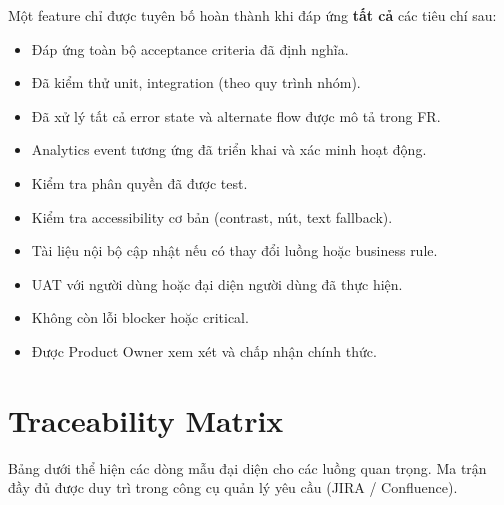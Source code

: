 \documentclass[12pt,a4paper]{article}
\begin{document}
Một feature chỉ được tuyên bố hoàn thành khi đáp ứng \textbf{tất cả} các tiêu chí sau:
\begin{itemize}
  \item[$\square$] Đáp ứng toàn bộ acceptance criteria đã định nghĩa.
  \item[$\square$] Đã kiểm thử unit, integration (theo quy trình nhóm).
  \item[$\square$] Đã xử lý tất cả error state và alternate flow được mô tả trong FR.
  \item[$\square$] Analytics event tương ứng đã triển khai và xác minh hoạt động.
  \item[$\square$] Kiểm tra phân quyền đã được test.
  \item[$\square$] Kiểm tra accessibility cơ bản (contrast, nút, text fallback).
  \item[$\square$] Tài liệu nội bộ cập nhật nếu có thay đổi luồng hoặc business rule.
  \item[$\square$] UAT với người dùng hoặc đại diện người dùng đã thực hiện.
  \item[$\square$] Không còn lỗi blocker hoặc critical.
  \item[$\square$] Được Product Owner xem xét và chấp nhận chính thức.
\end{itemize}

\section{Traceability Matrix}

\begin{tcolorbox}[notebox]
  Bảng dưới thể hiện các dòng mẫu đại diện cho các luồng quan trọng. Ma trận đầy đủ được duy trì trong công cụ quản lý yêu cầu (JIRA / Confluence).
\end{tcolorbox}
\end{document}
